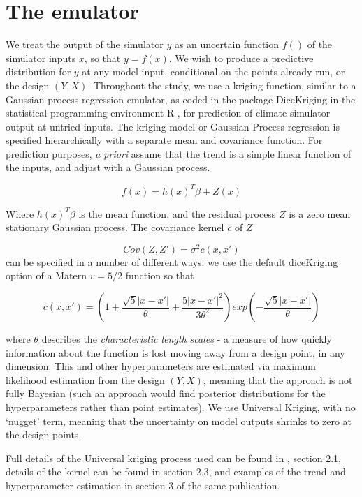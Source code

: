 \documentclass[gmd, manuscript]{copernicus} %
\begin{document}
\section{The emulator}

We treat the output of the simulator $y$ as an uncertain function $f()$ of the simulator inputs $x$, so that $y = f(x)$. We wish to produce a predictive distribution for $y$ at any model input, conditional on the points already run, or the design $(Y, X)$. Throughout the study, we use a kriging function, similar to a Gaussian process regression emulator, as coded in the package DiceKriging \citep{roustant2012dicekriging} in the statistical programming environment R \citep{Rcore2016}, for prediction of climate simulator output at untried inputs.
The kriging model or Gaussian Process regression is specified hierarchically with a separate mean and covariance function. For prediction purposes, \emph{a priori} assume that the trend is a simple linear function of the inputs, and adjust with a Gaussian process. 

$$
f(x) = h(x)^T \beta + Z(x)
$$

Where $h(x)^T \beta$ is the mean function, and the residual process $Z$ is a zero mean stationary Gaussian process. The covariance kernel $c$ of $Z$ 

$$
Cov(Z, Z') = \sigma^2 c(x,x')
$$
can be specified in a number of different ways: we use the default diceKriging option of a Matern $v=5/2$ function so that

$$
c(x,x') = (1 + \frac{\sqrt{5} | x - x'|}{\theta} + \frac{5 | x - x'|^2}{3 \theta^2})exp(- \frac{\sqrt{5} |x-x'|}{\theta})
$$

where $\theta$ describes the \emph{characteristic length scales} - a measure of how quickly information about the function is lost moving away from a design point, in any dimension. This and other hyperparameters are estimated via maximum likelihood estimation from the design $(Y, X)$, meaning that the approach is not fully Bayesian (such an approach would find posterior distributions for the hyperparameters rather than point estimates). We use Universal Kriging, with no `nugget' term, meaning that the uncertainty on model outputs shrinks to zero at the design points. 

Full details of the Universal kriging process used can be found in \cite{roustant2012dicekriging}, section 2.1, details of the kernel can be found in section 2.3, and examples of the trend and hyperparameter estimation  in section 3 of the same publication. 
\end{document}
